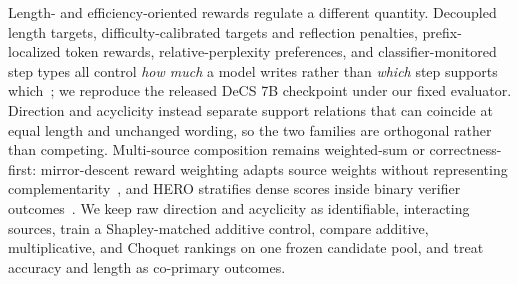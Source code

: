 Length- and efficiency-oriented rewards regulate a different quantity. Decoupled length targets, difficulty-calibrated targets and reflection penalties, prefix-localized token rewards, relative-perplexity preferences, and classifier-monitored step types all control \emph{how much} a model writes rather than \emph{which} step supports which~\citep{li2025drpo,jiang2026decs,liu2026laser,yu2026arlcp,han2026sar,belkhiter2025steptagging}; we reproduce the released DeCS 7B checkpoint under our fixed evaluator. Direction and acyclicity instead separate support relations that can coincide at equal length and unchanged wording, so the two families are orthogonal rather than competing. Multi-source composition remains weighted-sum or correctness-first: mirror-descent reward weighting adapts source weights without representing complementarity~\citep{li2024fairreward}, and HERO stratifies dense scores inside binary verifier outcomes~\citep{tao2026hero}. We keep raw direction and acyclicity as identifiable, interacting sources, train a Shapley-matched additive control, compare additive, multiplicative, and Choquet rankings on one frozen candidate pool, and treat accuracy and length as co-primary outcomes.

